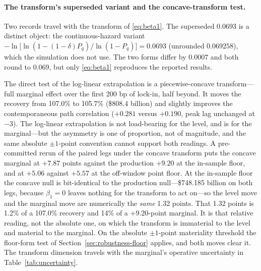 \documentclass[12pt]{article}
\begin{document}
\paragraph{The transform's superseded variant and the concave-transform test.}
Two records travel with the transform of \eqref{eq:beta1}. The superseded $0.0693$ is a distinct object: the continuous-hazard variant $-\ln\!\big[\ln(1-(1-\delta)P_q)/\ln(1-P_q)\big] = 0.0693$ (unrounded $0.069258$), which the simulation does not use. The two forms differ by $0.0007$ and both round to $0.069$, but only \eqref{eq:beta1} reproduces the reported results.

The direct test of the log-linear extrapolation is a piecewise-concave transform---full marginal effect over the first 200 bp of lock-in, half beyond. It moves the recovery from 107.0\% to 105.7\% (\$808.4 billion) and slightly improves the contemporaneous path correlation ($+0.281$ versus $+0.190$, peak lag unchanged at $-3$). The log-linear extrapolation is not load-bearing for the level, and is for the marginal---but the asymmetry is one of proportion, not of magnitude, and the same absolute $\pm 1$-point convention cannot support both readings. A pre-committed rerun of the paired legs under the concave transform puts the concave marginal at $+7.87$ points against the production $+9.20$ at the in-sample floor, and at $+5.06$ against $+5.57$ at the off-window point floor. At the in-sample floor the concave null is bit-identical to the production null---\$748.185 billion on both legs, because $\beta_1 = 0$ leaves nothing for the transform to act on---so the level move and the marginal move are numerically the \emph{same} 1.32 points. That 1.32 points is 1.2\% of a 107.0\% recovery and 14\% of a $+9.20$-point marginal. It is that relative reading, not the absolute one, on which the transform is immaterial to the level and material to the marginal. On the absolute $\pm 1$-point materiality threshold the floor-form test of Section~\ref{sec:robustness-floor} applies, and both moves clear it. The transform dimension travels with the marginal's operative uncertainty in Table~\ref{tab:uncertainty}.
\end{document}

